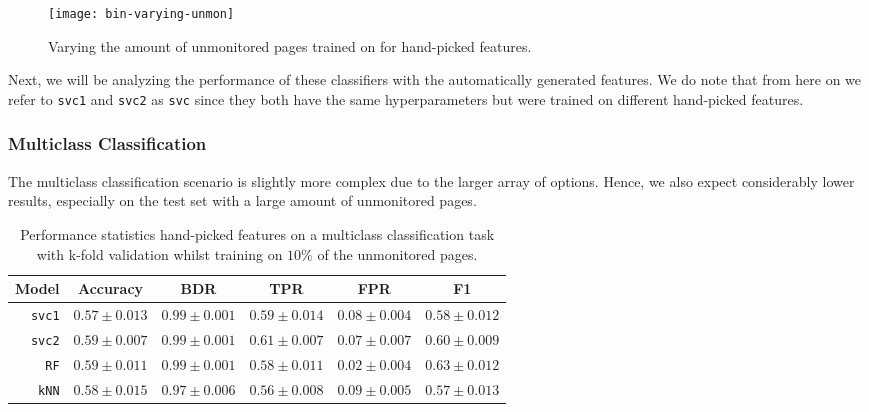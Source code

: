 \begin{figure}[ht]
  \centering
  \texttt{[image: bin-varying-unmon]}
  \caption{Varying the amount of unmonitored pages trained on for hand-picked features.}
  \label{fig:bin-varying-unmon}
\end{figure}

Next, we will be analyzing the performance of these classifiers with the automatically generated features.
We do note that from here on we refer to \texttt{svc1} and \texttt{svc2} as \texttt{svc} since they both have the same hyperparameters but were trained on different hand-picked features.


\subsubsection{Multiclass Classification}

The multiclass classification scenario is slightly more complex due to the larger array of options.
Hence, we also expect considerably lower results, especially on the test set with a large amount of unmonitored pages.

\begin{table}[ht]
  \centering
  \begin{tabular}{ r  r  r  r  r  r } \hline
    \multicolumn{1}{c}{\textbf{Model}} & \multicolumn{1}{c}{\textbf{Accuracy}} & \multicolumn{1}{c}{\textbf{BDR}} & \multicolumn{1}{c}{\textbf{TPR}} &
      \multicolumn{1}{c}{\textbf{FPR}} & \multicolumn{1}{c}{\textbf{F1}} \\ \hline

    \texttt{svc1} & $0.57 \pm 0.013$ & $0.99 \pm 0.001$ & $0.59 \pm 0.014$ & $0.08 \pm 0.004$ & $0.58 \pm 0.012$ \\

    \texttt{svc2} & $0.59 \pm 0.007$ & $0.99 \pm 0.001$ & $0.61 \pm 0.007$ & $0.07 \pm 0.007$ & $0.60 \pm 0.009$ \\

    \texttt{RF} & $0.59 \pm 0.011$ & $0.99 \pm 0.001$ & $0.58 \pm 0.011$ & $0.02 \pm 0.004$ & $0.63 \pm 0.012$\\

    \texttt{kNN} & $0.58 \pm 0.015$ & $0.97 \pm 0.006$ & $0.56 \pm 0.008$ & $0.09 \pm 0.005$ & $0.57 \pm 0.013$ \\

    \hline
  \end{tabular}
  \caption{Performance statistics hand-picked features on a multiclass classification task with k-fold validation whilst training on $10\%$ of the unmonitored pages.}
  \label{table:mult-handpicked-test-error}
\end{table}


